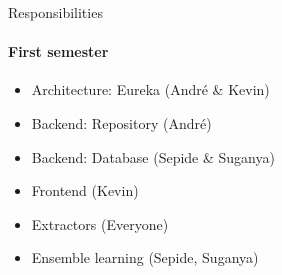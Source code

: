 \begin{frame}{Responsibilities}
\framesubtitle{First semester}
	\begin{itemize}
		\item Architecture: Eureka (André \& Kevin)
		\item Backend: Repository (André)
		\item Backend: Database (Sepide \& Suganya)
		\item Frontend (Kevin)
		\item Extractors (Everyone)
		\item Ensemble learning  (Sepide, Suganya)
	\end{itemize}
\end{frame}